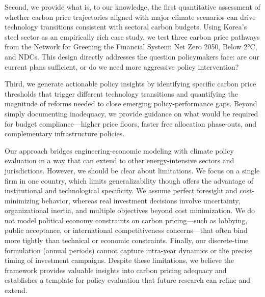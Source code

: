 Second, we provide what is, to our knowledge, the first quantitative assessment of whether carbon price trajectories aligned with major climate scenarios can drive technology transitions consistent with sectoral carbon budgets. Using Korea's steel sector as an empirically rich case study, we test three carbon price pathways from the Network for Greening the Financial System: Net Zero 2050, Below 2°C, and NDCs. This design directly addresses the question policymakers face: are our current plans sufficient, or do we need more aggressive policy intervention?

Third, we generate actionable policy insights by identifying specific carbon price thresholds that trigger different technology transitions and quantifying the magnitude of reforms needed to close emerging policy-performance gaps. Beyond simply documenting inadequacy, we provide guidance on what would be required for budget compliance—higher price floors, faster free allocation phase-outs, and complementary infrastructure policies.

Our approach bridges engineering-economic modeling with climate policy evaluation in a way that can extend to other energy-intensive sectors and jurisdictions. However, we should be clear about limitations. We focus on a single firm in one country, which limits generalizability though offers the advantage of institutional and technological specificity. We assume perfect foresight and cost-minimizing behavior, whereas real investment decisions involve uncertainty, organizational inertia, and multiple objectives beyond cost minimization. We do not model political economy constraints on carbon pricing—such as lobbying, public acceptance, or international competitiveness concerns—that often bind more tightly than technical or economic constraints. Finally, our discrete-time formulation (annual periods) cannot capture intra-year dynamics or the precise timing of investment campaigns. Despite these limitations, we believe the framework provides valuable insights into carbon pricing adequacy and establishes a template for policy evaluation that future research can refine and extend.
